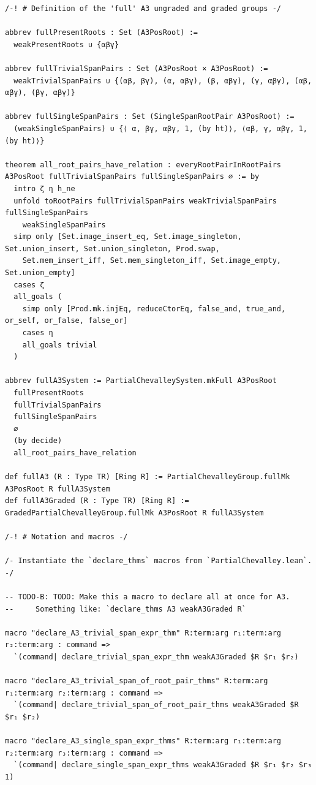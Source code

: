\documentclass[10pt,a4paper]{article}
\begin{document}
\begin{Verbatim}
/-! # Definition of the 'full' A3 ungraded and graded groups -/

abbrev fullPresentRoots : Set (A3PosRoot) :=
  weakPresentRoots ∪ {αβγ}

abbrev fullTrivialSpanPairs : Set (A3PosRoot × A3PosRoot) :=
  weakTrivialSpanPairs ∪ {(αβ, βγ), (α, αβγ), (β, αβγ), (γ, αβγ), (αβ, αβγ), (βγ, αβγ)}

abbrev fullSingleSpanPairs : Set (SingleSpanRootPair A3PosRoot) :=
  (weakSingleSpanPairs) ∪ {⟨ α, βγ, αβγ, 1, (by ht)⟩, ⟨αβ, γ, αβγ, 1, (by ht)⟩}

theorem all_root_pairs_have_relation : everyRootPairInRootPairs A3PosRoot fullTrivialSpanPairs fullSingleSpanPairs ∅ := by
  intro ζ η h_ne
  unfold toRootPairs fullTrivialSpanPairs weakTrivialSpanPairs fullSingleSpanPairs
    weakSingleSpanPairs
  simp only [Set.image_insert_eq, Set.image_singleton, Set.union_insert, Set.union_singleton, Prod.swap,
    Set.mem_insert_iff, Set.mem_singleton_iff, Set.image_empty, Set.union_empty]
  cases ζ
  all_goals (
    simp only [Prod.mk.injEq, reduceCtorEq, false_and, true_and, or_self, or_false, false_or]
    cases η
    all_goals trivial
  )

abbrev fullA3System := PartialChevalleySystem.mkFull A3PosRoot
  fullPresentRoots
  fullTrivialSpanPairs
  fullSingleSpanPairs
  ∅
  (by decide)
  all_root_pairs_have_relation

def fullA3 (R : Type TR) [Ring R] := PartialChevalleyGroup.fullMk A3PosRoot R fullA3System
def fullA3Graded (R : Type TR) [Ring R] := GradedPartialChevalleyGroup.fullMk A3PosRoot R fullA3System

/-! # Notation and macros -/

/- Instantiate the `declare_thms` macros from `PartialChevalley.lean`. -/

-- TODO-B: TODO: Make this a macro to declare all at once for A3.
--     Something like: `declare_thms A3 weakA3Graded R`

macro "declare_A3_trivial_span_expr_thm" R:term:arg r₁:term:arg r₂:term:arg : command =>
  `(command| declare_trivial_span_expr_thm weakA3Graded $R $r₁ $r₂)

macro "declare_A3_trivial_span_of_root_pair_thms" R:term:arg r₁:term:arg r₂:term:arg : command =>
  `(command| declare_trivial_span_of_root_pair_thms weakA3Graded $R $r₁ $r₂)

macro "declare_A3_single_span_expr_thms" R:term:arg r₁:term:arg r₂:term:arg r₃:term:arg : command =>
  `(command| declare_single_span_expr_thms weakA3Graded $R $r₁ $r₂ $r₃ 1)


\end{Verbatim}
\end{document}
